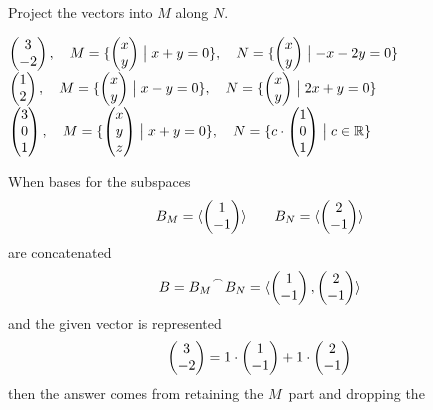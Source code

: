 \begin{exercises}
  \recommended \item
    Project the vectors into \( M \) along \( N \).
     \begin{exparts}
       \partsitem \( \begin{pmatrix} 3 \\ -2 \end{pmatrix},\quad
                M=\mbox{$\{\begin{pmatrix} x \\ y \end{pmatrix}\bigm| x+y=0\}$},\quad
                N=\mbox{$\{\begin{pmatrix} x \\ y \end{pmatrix}\bigm| -x-2y=0\}$} \)
       \partsitem \( \begin{pmatrix} 1 \\ 2 \end{pmatrix},\quad
                M=\mbox{$\{\begin{pmatrix} x \\ y \end{pmatrix}\bigm| x-y=0\}$},\quad
                N=\mbox{$\{\begin{pmatrix} x \\ y \end{pmatrix}\bigm| 2x+y=0\}$} \)
       \partsitem \( \begin{pmatrix} 3 \\ 0 \\ 1 \end{pmatrix},\quad
                M=\mbox{$\{\begin{pmatrix} x \\ y \\ z \end{pmatrix}\bigm| x+y=0\}$},\quad
                N=\mbox{$\{c\cdot\begin{pmatrix} 1 \\ 0 \\ 1 \end{pmatrix}\bigm| c\in\mathbb{R}\}$} \)
     \end{exparts}
     \begin{answer}
       \begin{exparts}
         \partsitem When bases for the subspaces
           \begin{equation*}
             B_M=\langle\begin{pmatrix} 1 \\ -1 \end{pmatrix}\rangle
             \qquad
             B_N=\langle\begin{pmatrix} 2 \\ -1 \end{pmatrix}\rangle
           \end{equation*}
           are concatenated 
           \begin{equation*}
             B=\cat{B_M}{B_N}=\sequence{\colvec{1 \\ -1},
                                        \colvec{2 \\ -1}}
           \end{equation*}
           and the given vector is represented
           \begin{equation*}
             \begin{pmatrix} 3 \\ -2 \end{pmatrix}=1\cdot\begin{pmatrix} 1 \\ -1 \end{pmatrix}+1\cdot\begin{pmatrix} 2 \\ -1 \end{pmatrix}
           \end{equation*}
           then the answer comes from retaining the $M$~part and dropping the 

\end{exparts}
\end{answer}
\end{exercises}
